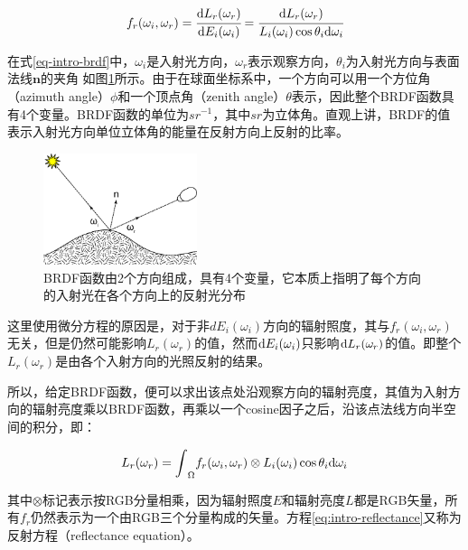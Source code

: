 \begin{equation}\label{eq-intro-brdf}
    f_r(\omega_i,\omega_r)= \cfrac{{\rm d}L_r(\omega_r)}{{\rm d}E_i(\omega_i)}= \cfrac{{\rm d}L_r(\omega_r)}{L_i(\omega_i)\cos\theta_i {\rm d}\omega_i}
\end{equation}

\noindent 在式\ref{eq-intro-brdf}中，$\omega_i$是入射光方向，$\omega_r$表示观察方向，$\theta_i$为入射光方向与表面法线$\mathbf{n}$的夹角 如图\ref{f:intro-brdf}所示。由于在球面坐标系中，一个方向可以用一个方位角（azimuth angle）$\phi$和一个顶点角（zenith angle）$\theta$表示，因此整个BRDF函数具有4个变量。BRDF函数的单位为$sr^{-1}$，其中$sr$为立体角。直观上讲，BRDF的值表示入射光方向单位立体角的能量在反射方向上反射的比率。

\begin{figure}
\sidecaption
	\includegraphics[width=0.4\textwidth]{figures/intro/BRDF_Diagram}
	\caption{BRDF函数由2个方向组成，具有4个变量，它本质上指明了每个方向的入射光在各个方向上的反射光分布}
	\label{f:intro-brdf}
\end{figure}

这里使用微分方程的原因是，对于非$dE_i(\omega_i)$方向的辐射照度，其与$f_r(\omega_i,\omega_r)$无关，但是仍然可能影响$L_r(\omega_r)$的值，然而${\rm d}E_i(\omega_i)$只影响${\rm d}L_r(\omega_r)$的值。即整个$L_r(\omega_r)$是由各个入射方向的光照反射的结果。

所以，给定BRDF函数，便可以求出该点处沿观察方向的辐射亮度，其值为入射方向的辐射亮度乘以BRDF函数，再乘以一个cosine因子之后，沿该点法线方向半空间的积分，即：


\begin{equation}\label{eq:intro-reflectance}
	L_r(\omega_r)={\rm \int}_{\Omega}f_r(\omega_i,\omega_r)\otimes L_i(\omega_i)\cos\theta_i {\rm d}\omega_i
\end{equation}

\noindent 其中$\otimes$标记表示按RGB分量相乘，因为辐射照度$E$和辐射亮度$L$都是RGB矢量，所有$f_r$仍然表示为一个由RGB三个分量构成的矢量。方程\ref{eq:intro-reflectance}又称为反射方程（reflectance equation）。




